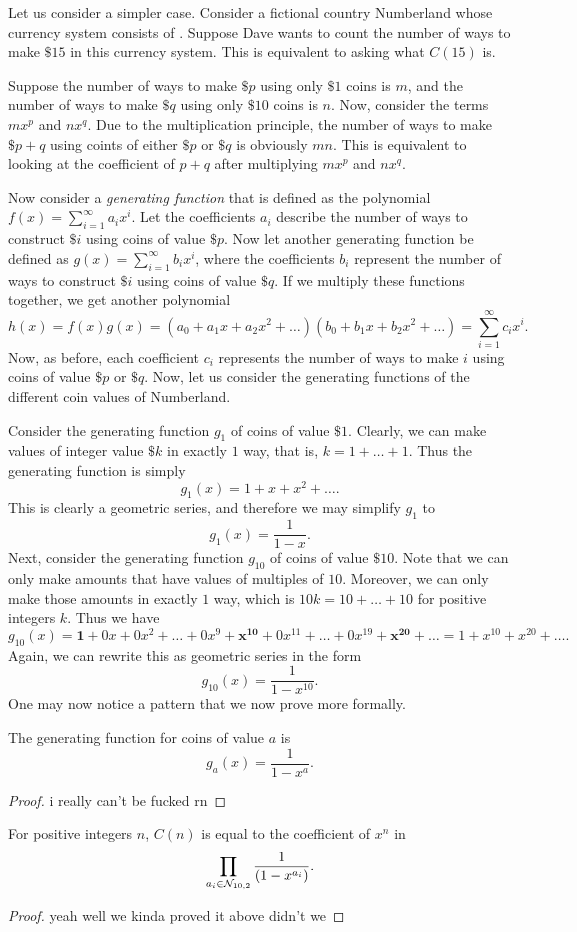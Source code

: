 \documentclass{article}
\begin{document}
Let us consider a simpler case. Consider a fictional country Numberland whose currency system consists of \NTen. Suppose Dave wants to count the number of ways to make  $\$ 15$ in this currency system. This is equivalent to asking what $C(15)$ is.

Suppose the number of ways to make $\$ p$ using only $\$ 1$ coins is $m$, and the number of ways to make $\$ q$ using only $\$ 10$ coins is $n$. Now, consider the terms $mx^{p}$ and $nx^{q}$. Due to the multiplication principle, the number of ways to make $\$ p+q$ using coints of either $\$ p$ or $\$ q$ is obviously $mn$. This is equivalent to looking at the coefficient of $p+q$ after multiplying $mx^{p}$ and $nx^{q}$.

Now consider a \emph{generating function} that is defined as the polynomial $f(x) = \sum_{i=1}^{\infty} a_i x^i$. Let the coefficients $a_i$ describe the number of ways to construct $\$ i$ using coins of value $\$ p$. Now let another generating function be defined as $g(x) = \sum_{i=1}^{\infty} b_i x^i$, where the coefficients $b_i$ represent the number of ways to construct $\$ i$ using coins of value $\$ q$. If we multiply these functions together, we get another polynomial \[
  h(x) = f(x)g(x) = (a_0 + a_1x + a_2x^2 + \dots)(b_0 + b_1x + b_2x^2 + \dots) = \sum_{i=1}^{\infty} c_ix^{i}
.\] Now, as before, each coefficient $c_i$ represents the number of ways to make $i$ using coins of value $\$ p$ or $\$ q$. Now, let us consider the generating functions of the different coin values of Numberland.

Consider the generating function $g_1$ of coins of value $\$ 1$. Clearly, we can make values of integer value $\$ k$ in exactly $1$ way, that is, $k = 1 + \dots + 1$. Thus the generating function is simply \[
  g_{1}(x) = 1 + x + x^2 + \dots
.\] This is clearly a geometric series, and therefore we may simplify $g_1$ to \[
  g_1(x) = \frac{1}{1-x}
.\] Next, consider the generating function $g_{10}$ of coins of value $\$ 10$. Note that we can only make amounts that have values of multiples of  $10$. Moreover, we can only make those amounts in exactly $1$ way, which is $10k = 10 + \dots + 10$ for positive integers $k$. Thus we have \[
g_{10}(x) = \bm{1} + 0x + 0x^2 + \dots + 0x^{9} + \bm{x^{10}} + 0x^{11} + \dots + 0x^{19} + \bm{x^{20}} + \dots = 1 + x^{10} + x^{20} + \dots
.\] Again, we can rewrite this as geometric series in the form \[
  g_{10}(x) = \frac{1}{1-x^{10}}
.\] One may now notice a pattern that we now prove more formally.
\begin{theorem}
  The generating function for coins of value $a$ is \[
    g_a(x) = \frac{1}{1-x^a}
  .\] 
\end{theorem}
\begin{proof}
  i really can't be fucked rn
\end{proof}
\begin{theorem}
  For positive integers $n$, $C(n)$ is equal to the coefficient of $x^{n}$ in \[
    \prod_{a_i \in \mathcal{N}_{10, 2}} \frac{1}{(1-x^{a_i})}
  .\] 
\end{theorem}
\begin{proof}
  yeah well we kinda proved it above didn't we
\end{proof}
\end{document}

